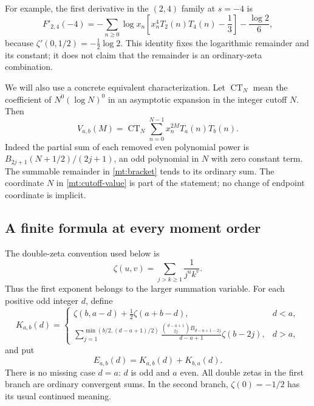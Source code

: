For example, the first derivative in the $(2,4)$ family at $s=-4$ is
\begin{equation}\label{mt:derivative-example}
 F'_{2,4}(-4)=
 -\sum_{n\geq0}\log x_n
        \left[x_n^4T_2(n)T_4(n)-\frac13\right]
 -\frac{\log 2}{6},
\end{equation}
because $\zeta'(0,1/2)=-\tfrac12\log2$. This identity fixes the
logarithmic remainder and its constant; it does not claim that the
remainder is an ordinary-zeta combination.

We will also use a concrete equivalent characterization. Let
$\operatorname{CT}_N$ mean the coefficient of $N^0(\log N)^0$ in
an asymptotic expansion in the integer cutoff $N$. Then
\begin{equation}\label{mt:cutoff-value}
 V_{a,b}(M)=\operatorname{CT}_N
   \sum_{n=0}^{N-1}x_n^{2M}T_a(n)T_b(n).
\end{equation}
Indeed the partial sum of each removed even polynomial power is
$B_{2j+1}(N+1/2)/(2j+1)$, an odd polynomial in $N$ with zero constant
term. The summable remainder in \eqref{mt:bracket} tends to its ordinary
sum. The coordinate $N$ in \eqref{mt:cutoff-value} is part of the
statement; no change of endpoint coordinate is implicit.

\subsection{A finite formula at every moment order}

The double-zeta convention used below is
\[
 \zeta(u,v)=\sum_{j>k\ge1}\frac1{j^u k^v}.
\]
Thus the first exponent belongs to the larger summation variable.
For each positive odd integer $d$, define
\begin{equation}\label{mt:oriented}
 K_{a,b}(d)=
 \begin{cases}
  \displaystyle\zeta(b,a-d)+\frac12\zeta(a+b-d),&d<a,\\[2mm]
  \displaystyle\sum_{j=1}^{\min(b/2,(d-a+1)/2)}
    \frac{\binom{d-a+1}{2j}B_{d-a+1-2j}}{d-a+1}
             \zeta(b-2j),&d>a,
 \end{cases}
\end{equation}
and put
\begin{equation}\label{mt:E}
 E_{a,b}(d)=K_{a,b}(d)+K_{b,a}(d).
\end{equation}
There is no missing case $d=a$: $d$ is odd and $a$ even. All double
zetas in the first branch are ordinary convergent sums. In the second
branch, $\zeta(0)=-1/2$ has its usual continued meaning.

